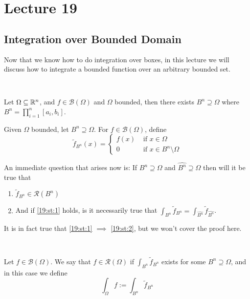 \documentclass[../Analysis-3.tex]{subfiles}
\begin{document}
\chapter*{Lecture 19} %
\setcounter{chapter}{19} %
\setcounter{section}{0}
\setcounter{equation}{0}
\setcounter{figure}{0}


\section{Integration over Bounded Domain}

Now that we know how to do integration over boxes, in this lecture we will discuss how to integrate a bounded function over an arbitrary bounded set.

\

Let $\Omega \subseteq \mathbb{R}^n$, and $f \in \mathscr{B}(\Omega)$ and $\Omega$ bounded, then there exists $B^n \supseteq \Omega$ where $B^n = \prod_{i=1}^n [a_i, b_i]$.

\begin{Def}{}{}
  Given $\Omega$ bounded, let $B^n \supseteq \Omega$. For $f \in \mathscr{B}(\Omega)$, define
  \[
    \tilde{f}_{B^n}(x) = \begin{cases}
      f(x) & \mbox{ if } x \in \Omega               \\
      0    & \mbox{ if } x \in B^n \setminus \Omega
    \end{cases}
  \]
\end{Def}

An immediate question that arises now is: If $B^n \supseteq \Omega$ and $\hat{B^n} \supseteq \Omega$ then will it be true that
\begin{enumerate}[label=(\Roman*)]
  \item $\tilde{f}_{B^n} \in \mathscr{R}(B^n)$   \label{19:st:1}
  \item And if \ref{19:st:1} holds, is it necessarily true that $\displaystyle{\int_{B^n} \tilde{f}_{B^n} = \int_{\hat{B^n}} \tilde{f}_{\hat{B^n}}}$.  \label{19:st:2}
\end{enumerate}
It is in fact true that \ref{19:st:1} $\implies$ \ref{19:st:2}, but we won't cover the proof here.

\

\begin{Def}{}{}
  Let $f \in \mathscr{B}(\Omega)$. We say that $f \in \mathscr{R}(\Omega)$ if $\displaystyle\int_{B^n} \tilde{f}_{B^n}$ exists for some $B^n \supseteq \Omega$, and in this case we define
  \[
    \int_{\Omega} f := \int_{B^n} \tilde{f}_{B^n}
  \]
\end{Def}
\end{document}
